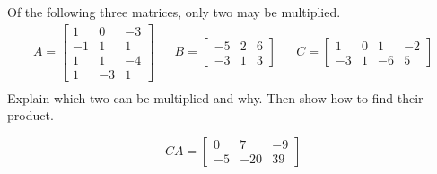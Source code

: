 
\begin{exerciseStatement}


Of the following three matrices, only two may be multiplied. 
\begin{align*} A= \left[\begin{array}{ccc}
1 & 0 & -3 \\
-1 & 1 & 1 \\
1 & 1 & -4 \\
1 & -3 & 1
\end{array}\right]  & & B= \left[\begin{array}{ccc}
-5 & 2 & 6 \\
-3 & 1 & 3
\end{array}\right]  & & C= \left[\begin{array}{cccc}
1 & 0 & 1 & -2 \\
-3 & 1 & -6 & 5
\end{array}\right]  \\ \end{align*}
             Explain which two can be multiplied and why. Then show how to find their product.


\end{exerciseStatement}
    
\begin{exerciseAnswer} 
\[CA= \left[\begin{array}{ccc}
0 & 7 & -9 \\
-5 & -20 & 39
\end{array}\right] \]
\end{exerciseAnswer}
    
